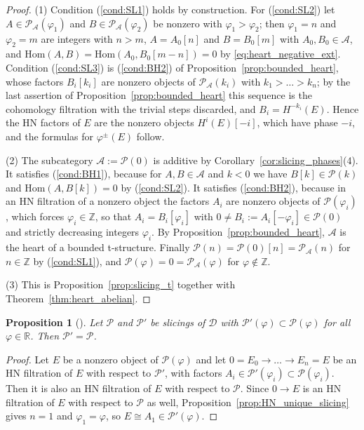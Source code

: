 \documentclass[12pt]{amsart}
\newcommand{\condref}[1]{\textup{(\ref{#1})}}
\newtheorem{proposition}[theorem]{Proposition}
\numberwithin{theorem}{section}
\theoremstyle{definition}
\newcommand{\RR}{\mathbb{R}}
\newcommand{\ZZ}{\mathbb{Z}}
\newcommand{\calA}{\mathcal{A}}
\newcommand{\calP}{\mathcal{P}}
\newcommand{\Hom}{\mathrm{Hom}}
\newcommand{\calD}{\mathcal{D}}
\begin{document}
	\begin{proof}
		(1) Condition \condref{cond:SL1} holds by construction.
		For \condref{cond:SL2} let $A \in \calP_{\calA}(\varphi_1)$ and $B \in \calP_{\calA}(\varphi_2)$ be nonzero with $\varphi_1 > \varphi_2$;
		then $\varphi_1 = n$ and $\varphi_2 = m$ are integers with $n > m$, $A = A_0[n]$ and $B = B_0[m]$ with $A_0, B_0 \in \calA$, and $\Hom(A, B) = \Hom(A_0, B_0[m - n]) = 0$ by \eqref{eq:heart_negative_ext}.
		Condition \condref{cond:SL3} is \condref{cond:BH2} of Proposition~\ref{prop:bounded_heart}, whose factors $B_i[k_i]$ are nonzero objects of $\calP_{\calA}(k_i)$ with $k_1 > \ldots > k_n$;
		by the last assertion of Proposition~\ref{prop:bounded_heart} this sequence is the cohomology filtration with the trivial steps discarded, and $B_i = H^{-k_i}(E)$.
		Hence the HN factors of $E$ are the nonzero objects $H^i(E)[-i]$, which have phase $-i$, and the formulas for $\varphi^{\pm}(E)$ follow.

		(2) The subcategory $\calA := \calP(0)$ is additive by Corollary~\ref{cor:slicing_phases}(4).
		It satisfies \condref{cond:BH1}, because for $A, B \in \calA$ and $k < 0$ we have $B[k] \in \calP(k)$ and $\Hom(A, B[k]) = 0$ by \condref{cond:SL2}.
		It satisfies \condref{cond:BH2}, because in an HN filtration of a nonzero object the factors $A_i$ are nonzero objects of $\calP(\varphi_i)$, which forces $\varphi_i \in \ZZ$, so that $A_i = B_i[\varphi_i]$ with $0 \neq B_i := A_i[-\varphi_i] \in \calP(0)$ and strictly decreasing integers $\varphi_i$.
		By Proposition~\ref{prop:bounded_heart}, $\calA$ is the heart of a bounded t-structure.
		Finally $\calP(n) = \calP(0)[n] = \calP_{\calA}(n)$ for $n \in \ZZ$ by \condref{cond:SL1}, and $\calP(\varphi) = 0 = \calP_{\calA}(\varphi)$ for $\varphi \notin \ZZ$.

		(3) This is Proposition~\ref{prop:slicing_t} together with Theorem~\ref{thm:heart_abelian}.
	\end{proof}

	\begin{proposition}[{\cite[Exercise~5.6]{MS17}}]
		\label{prop:slicing_inclusion}
		Let $\calP$ and $\calP'$ be slicings of $\calD$ with $\calP'(\varphi) \subset \calP(\varphi)$ for all $\varphi \in \RR$.
		Then $\calP' = \calP$.
	\end{proposition}

	\begin{proof}
		Let $E$ be a nonzero object of $\calP(\varphi)$ and let $0 = E_0 \to \ldots \to E_n = E$ be an HN filtration of $E$ with respect to $\calP'$, with factors $A_i \in \calP'(\varphi_i) \subset \calP(\varphi_i)$.
		Then it is also an HN filtration of $E$ with respect to $\calP$.
		Since $0 \to E$ is an HN filtration of $E$ with respect to $\calP$ as well, Proposition~\ref{prop:HN_unique_slicing} gives $n = 1$ and $\varphi_1 = \varphi$, so $E \cong A_1 \in \calP'(\varphi)$.
	\end{proof}
\end{document}
